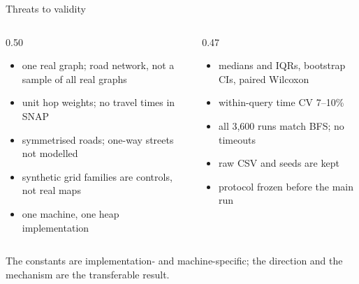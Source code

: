 \documentclass[aspectratio=169,10pt]{beamer}
\begin{document}
\begin{frame}{Threats to validity}
  \begin{columns}[T,onlytextwidth]
    \begin{column}{0.50\textwidth}
      \begin{itemize}
        \item one real graph; road network, not a sample of all real graphs
        \item unit hop weights; no travel times in SNAP
        \item symmetrised roads; one-way streets not modelled
        \item synthetic grid families are controls, not real maps
        \item one machine, one heap implementation
      \end{itemize}
    \end{column}
    \begin{column}{0.47\textwidth}
      \begin{itemize}
        \item medians and IQRs, bootstrap CIs, paired Wilcoxon
        \item within-query time CV 7--10\%
        \item all 3,600 runs match BFS; no timeouts
        \item raw CSV and seeds are kept
        \item protocol frozen before the main run
      \end{itemize}
    \end{column}
  \end{columns}
  \vspace{0.6em}
  \centering
  \small The constants are implementation- and machine-specific; the direction
  and the mechanism are the transferable result.
\end{frame}
\end{document}
